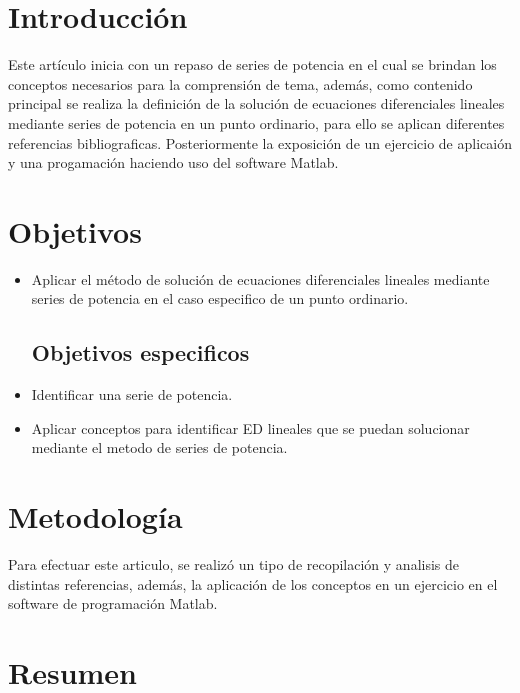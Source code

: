 \documentclass[12pt,letterpaper,oneside]{article}
\begin{document}
\thispagestyle{empty}
\newpage
\setcounter{page}{1}
\section{Introducción}
Este artículo inicia con un repaso de series de potencia en el cual se brindan los conceptos necesarios para la comprensión de tema, además, como contenido principal se realiza la definición de la solución de ecuaciones diferenciales lineales mediante series de potencia en un punto ordinario, para ello se aplican diferentes referencias bibliograficas. Posteriormente la exposición de un ejercicio de aplicaión y una progamación haciendo uso del software Matlab.
\section{Objetivos}
\begin{itemize}
\subsection{Objetivo principal}
 \item Aplicar el método de solución de ecuaciones diferenciales lineales mediante series de potencia en el caso especifico de un punto ordinario.
\subsection{Objetivos especificos}

 \item Identificar una serie de potencia.\\
\item Aplicar conceptos para identificar ED lineales que se puedan solucionar mediante el metodo de series de potencia.
\end{itemize}
\section{Metodología}
 Para efectuar este articulo, se realizó un tipo de recopilación y analisis de distintas referencias, además, la aplicación de los conceptos en un ejercicio en el software de programación Matlab.
 
\section{Resumen}
\end{document}
